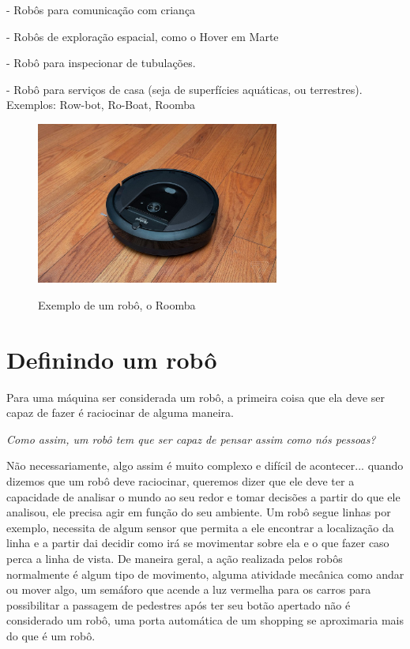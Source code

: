 - Robôs para comunicação com criança

- Robôs de exploração espacial, como o Hover em Marte

- Robô para inspecionar de tubulações.

- Robô para serviços de casa (seja de superfícies aquáticas, ou terrestres). Exemplos: Row-bot, Ro-Boat, Roomba

    \begin{figure}[h]
    \caption{Exemplo de um robô, o Roomba}
     
    \centering 
    \includegraphics[width=8cm]{Figuras/roomba.jpg}
    \label{figura:roomba.jpeg}
    \end{figure}
 

\section{Definindo um robô}
Para uma máquina ser considerada um robô, a primeira coisa que ela deve ser capaz de fazer é raciocinar de alguma maneira.

\textit{Como assim, um robô tem que ser capaz de pensar assim como nós pessoas?}

Não necessariamente, algo assim é muito complexo e difícil de acontecer... quando dizemos que um robô deve raciocinar, queremos dizer que ele deve ter a capacidade de analisar o mundo ao seu redor e tomar decisões a partir do que ele analisou, ele precisa agir em função do seu ambiente. Um robô segue linhas por exemplo, necessita de algum sensor que permita a ele encontrar a localização da linha e a partir dai decidir como irá se movimentar sobre ela e o que fazer caso perca a linha de vista. De maneira geral, a ação realizada pelos robôs normalmente é algum tipo de movimento, alguma atividade mecânica como andar ou mover algo, um semáforo que acende a luz vermelha para os carros para possibilitar a passagem de pedestres após ter seu botão apertado não é considerado um robô, uma porta automática de um shopping se aproximaria mais do que é um robô.


